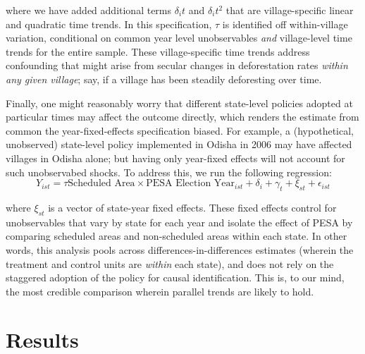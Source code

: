 \documentclass[12pt,reqno]{article}
\begin{document}
where we have added additional terms $\delta_i t$ and $\delta_i t^2$ that are village-specific linear and quadratic time trends. In this specification, $\tau$ is identified off within-village variation, conditional on common year level unobservables \emph{and} village-level time trends for the entire sample. These village-specific time trends address confounding that might arise from secular changes in deforestation rates \emph{within any given village}; say, if a village has been steadily deforesting over time. 


Finally, one might reasonably worry that different state-level policies adopted at particular times may affect the outcome directly, which renders the estimate from common the year-fixed-effects specification biased. For example, a (hypothetical, unobserved) state-level policy implemented in Odisha in 2006 may have affected villages in Odisha alone; but having only year-fixed effects will not account for such unobservabed shocks. To address this, we run the following regression:
\begin{equation}\label{styfe}
Y_{ist} = \tau \text{Scheduled Area} \times \text{PESA Election Year}_{ist} +
\delta_i + \gamma_t + \xi_{st} + \epsilon_{ist}
\end{equation}

where $\xi_{st}$ is a vector of state-year fixed effects. These fixed effects control for unobservables that vary by state for each year and isolate the effect of PESA by comparing scheduled areas and non-scheduled areas within each state. In other words, this analysis pools across differences-in-differences estimates (wherein the treatment and control units are \emph{within} each state), and does not rely on the staggered adoption of the policy for causal identification. This is, to our mind, the most credible comparison wherein parallel trends are likely to hold.



\section{Results}\label{sec:Results} %
\end{document}
